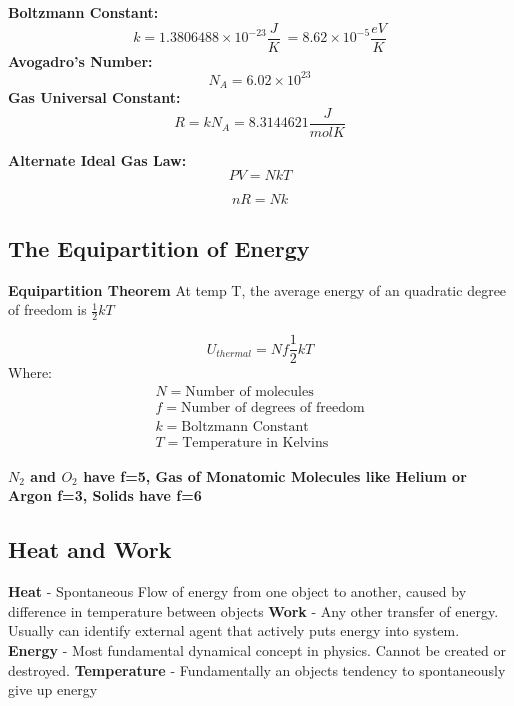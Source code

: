 \textbf{Boltzmann Constant:}
\[k= 1.3806488 \times 10^{-23} \frac{J}{K}\ = 8.62 \times 10^{-5}\frac{eV}{K}\]
\textbf{Avogadro's Number:}
\[N_A = 6.02 \times 10^{23}\]
\textbf{Gas Universal Constant:}
\[R = k N_A = 8.3144621 \frac{J}{mol K}\]

\textbf{Alternate Ideal Gas Law:}
\[PV = NkT\]

\[nR = Nk\]


\subsection{The Equipartition of Energy}
\begin{shaded}
\textbf{Equipartition Theorem}\newline 
At temp T, the average energy of an quadratic degree of freedom is $\frac{1}{2}kT$

\begin{equation}
U_{thermal} = Nf \frac{1}{2} kT
\end{equation}
Where:
\begin{equation*}
\begin{split}
N = \text{Number of molecules} \\
f = \text{Number of degrees of freedom} \\
k = \text{Boltzmann Constant}\\
T = \text{Temperature in Kelvins}
\end{split}
\end{equation*}
\end{shaded}
\begin{note}

\textbf{$N_2$ and $O_2$ have f=5, Gas of Monatomic Molecules like Helium or Argon f=3, Solids have f=6}
\end{note}


\subsection{Heat and Work}
\textbf{Heat} - Spontaneous Flow of energy from one object to another, caused by difference in temperature between objects \newline
\textbf{Work} - Any other transfer of energy. Usually can identify external agent that actively puts energy into system.\newline
\textbf{Energy} - Most fundamental dynamical concept in physics. Cannot be created or destroyed.\newline
\textbf{Temperature} - Fundamentally an objects tendency to spontaneously give up energy \newline

